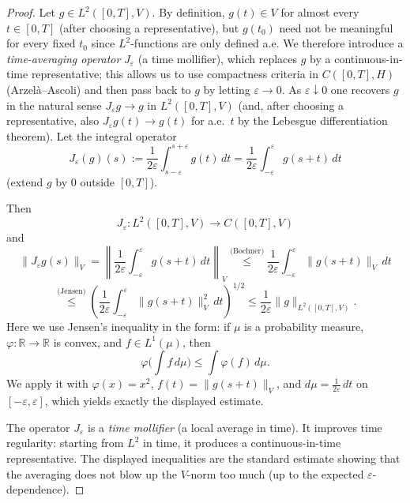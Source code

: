 \documentclass[11pt]{article}
\theoremstyle{definition}
\theoremstyle{remark}
\begin{document}
\begin{proof}
Let \(g\in L^{2}([0,T],V)\). By definition, \(g(t)\in V\) for almost every \(t\in[0,T]\) (after choosing a representative), but \(g(t_{0})\) need not be meaningful for every fixed \(t_{0}\) since \(L^{2}\)-functions are only defined a.e.
We therefore introduce a \emph{time-averaging operator} \(J_\varepsilon\) (a time mollifier), which replaces \(g\) by a continuous-in-time representative; this allows us to use compactness criteria in \(C([0,T],H)\) (Arzel\`a--Ascoli) and then pass back to \(g\) by letting \(\varepsilon\to 0\).
As \(\varepsilon\downarrow 0\) one recovers \(g\) in the natural sense \(J_\varepsilon g\to g\) in \(L^{2}([0,T],V)\) (and, after choosing a representative, also \(J_\varepsilon g(t)\to g(t)\) for a.e.\ \(t\) by the Lebesgue differentiation theorem).
Let the integral operator
\[
J_\varepsilon(g)(s):=\frac{1}{2\varepsilon}\int_{s-\varepsilon}^{s+\varepsilon}g(t)\,dt
=\frac{1}{2\varepsilon}\int_{-\varepsilon}^{\varepsilon}g(s+t)\,dt
\]
(extend \(g\) by \(0\) outside \([0,T]\)).

Then
\[
J_\varepsilon:L^{2}([0,T],V)\to C([0,T],V)
\]
and
\[
\|J_\varepsilon g(s)\|_{V}
=\left\|\frac{1}{2\varepsilon}\int_{-\varepsilon}^{\varepsilon}g(s+t)\,dt\right\|_{V}
\overset{\text{(Bochner)}}{\le}\frac{1}{2\varepsilon}\int_{-\varepsilon}^{\varepsilon}\|g(s+t)\|_{V}\,dt
\]
\[
\overset{\text{(Jensen)}}{\le}\left(\frac{1}{2\varepsilon}\int_{-\varepsilon}^{\varepsilon}\|g(s+t)\|_{V}^{2}\,dt\right)^{1/2}
\le\frac{1}{2\varepsilon}\|g\|_{L^{2}([0,T],V)}.
\]
Here we use Jensen's inequality in the form: if \(\mu\) is a probability measure, \(\varphi:\mathbb{R}\to\mathbb{R}\) is convex, and \(f\in L^{1}(\mu)\), then
\[
\varphi\Big(\int f\,d\mu\Big)\le \int \varphi(f)\,d\mu.
\]
We apply it with \(\varphi(x)=x^{2}\), \(f(t)=\|g(s+t)\|_{V}\), and \(d\mu=\frac{1}{2\varepsilon}\,dt\) on \([-\varepsilon,\varepsilon]\), which yields exactly the displayed estimate.

The operator \(J_\varepsilon\) is a \emph{time mollifier} (a local average in time).
It improves time regularity: starting from \(L^{2}\) in time, it produces a continuous-in-time representative.
The displayed inequalities are the standard estimate showing that the averaging does not blow up the \(V\)-norm too much (up to the expected \(\varepsilon\)-dependence).


\end{proof}
\end{document}
